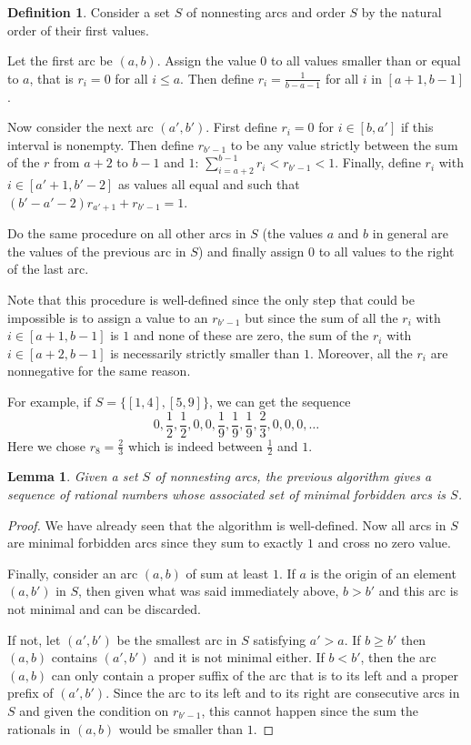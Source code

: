 \documentclass{amsart}
\newtheorem{lemma}[theorem]{Lemma}
\theoremstyle{definition}
\newtheorem{definition}[theorem]{Definition}
\begin{document}
\begin{definition}
Consider a set $S$ of nonnesting arcs and order $S$ by the natural order of
their first values.

Let the first arc be $(a,b)$. Assign the value $0$ to all values smaller than
or equal to $a$, that is $r_i=0$ for all $i\leq a$.
Then define $r_i=\frac{1}{b-a-1}$ for all $i$ in $[a+1,b-1]$.

Now consider the next arc $(a',b')$.
First define $r_i=0$ for $i\in[b,a']$ if this interval is nonempty.
Then define $r_{b'-1}$ to be any value strictly between the sum of the $r$
from $a+2$ to $b-1$ and $1$:
$ \sum_{i=a+2}^{b-1} r_i < r_{b'-1}<1$.
Finally, define $r_i$ with $i\in [a'+1,b'-2]$ as values all equal and such
that $(b'-a'-2)r_{a'+1} + r_{b'-1}=1$.

Do the same procedure on all other arcs in $S$ (the values $a$ and $b$ in
general are the values of the previous arc in $S$) and
finally assign $0$ to all values to the right of the last arc.

Note that this procedure is well-defined since the only step that could be
impossible is to assign a value to an $r_{b'-1}$ but since the sum of all the
$r_i$ with $i\in[a+1,b-1]$ is $1$ and none of these are zero, the sum
of the $r_i$ with $i\in[a+2,b-1]$ is necessarily strictly smaller than $1$.
Moreover, all the $r_i$ are nonnegative for the same reason.
\end{definition}

For example, if $S=\{[1,4],[5,9]\}$, we can get the sequence
\begin{equation}
0,\frac12,\frac12,0,0,\frac19,\frac19,\frac19,\frac23,0,0,0,\dots
\end{equation}
Here we chose $r_8=\frac23$ which is indeed between $\frac12$ and $1$.

\begin{lemma}
Given a set $S$ of nonnesting arcs, the previous algorithm gives a sequence of
rational numbers whose associated set of minimal forbidden arcs is $S$.
\end{lemma}

\begin{proof}
We have already seen that the algorithm is well-defined.
Now all arcs in $S$ are minimal forbidden arcs since they sum to exactly $1$
and cross no zero value.

Finally, consider an arc $(a,b)$ of sum at least $1$.
If $a$ is the origin of an element $(a,b')$ in $S$, then given what was said
immediately above, $b>b'$ and this arc is not minimal and can be discarded.

If not, let $(a',b')$ be the smallest arc in $S$ satisfying $a'>a$.
If $b\geq b'$ then $(a,b)$ contains $(a',b')$ and it is not minimal
either.
If $b<b'$, then the arc $(a,b)$ can only contain a proper suffix of the arc
that is to its left and a proper prefix of $(a',b')$. Since the arc to its
left and to its right are consecutive arcs in $S$ and given the condition on
$r_{b'-1}$, this cannot happen since the sum the rationals in $(a,b)$ would be
smaller than $1$.
\end{proof}
\end{document}
